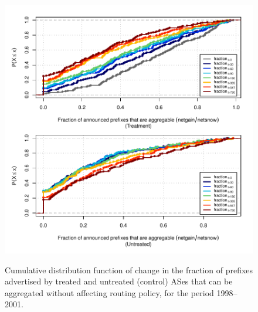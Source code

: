 \begin{figure}[H]
\begin{centering}
\begin{singlespace}
    \includegraphics[width=6in]{figures/behavior-frac_deagg-1998_2001-corr.pdf}
    \vspace{-2em}\\
    \caption{Cumulative distribution function of change in the fraction of
    prefixes advertised by treated and untreated (control) ASes that can be
    aggregated without affecting routing policy, for the period 1998--2001.}
\end{singlespace}
\end{centering}
\end{figure}
